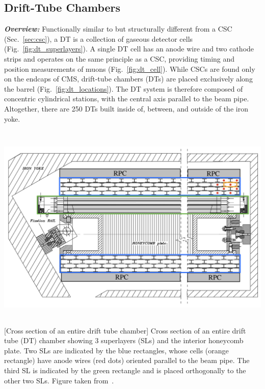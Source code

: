 \subsection{Drift-Tube Chambers}
\label{sec:dt}

\textbf{\textit{Overview:}}
Functionally similar to but structurally different from a CSC (Sec.~\ref{sec:csc}), a DT is a collection of gaseous detector cells (Fig.~\ref{fig:dt_superlayers}).
A single DT cell has an anode wire and two cathode strips and operates on the same principle as a CSC, providing timing and position measurements of muons (Fig.~\ref{fig:dt_cell}).
While CSCs are found only on the endcaps of CMS, drift-tube chambers (DTs) are placed exclusively along the barrel (Fig.~\ref{fig:dt_locations}).
The DT system is therefore composed of concentric cylindrical stations, with the central axis parallel to the beam pipe.
Altogether, there are 250 DTs built inside of, between, and outside of the iron yoke.
\begin{multiFigure}
    \centering
    \includegraphics[width=15cm,height=10cm,keepaspectratio]{figures/cms/muonsys/drifttube_superlayers.jpeg}
        [Cross section of an entire drift tube chamber]
        {Cross section of an entire drift tube (DT) chamber showing 3 superlayers (SLs) and the interior honeycomb plate.
        Two SLs are indicated by the blue rectangles, whose cells (orange rectangle) have anode wires (red dots) oriented parallel to the beam pipe.
        The third SL is indicated by the green rectangle and is placed orthogonally to the other two SLs.
        Figure taken from~\cite{PhysRevLett.114.191803}. %
        }
    \label{fig:dt_superlayers}
\end{multiFigure}
